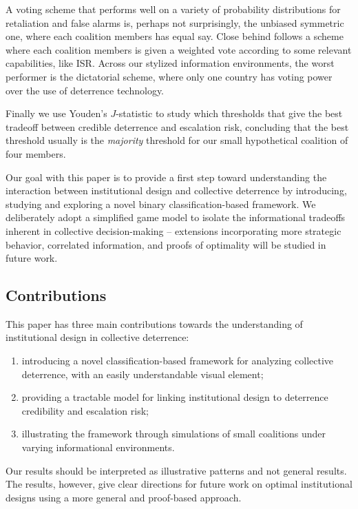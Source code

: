 A voting scheme that performs well on a variety of probability distributions for retaliation and false alarms is, perhaps not surprisingly, the unbiased symmetric one, where each coalition members has equal say. Close behind follows a scheme where each coalition members is given a weighted vote according to some relevant capabilities, like ISR. Across our stylized information environments, the worst performer is the dictatorial scheme, where only one country has voting power over the use of deterrence technology.

Finally we use Youden's $J$-statistic \parencite{Youden_1950} to study which thresholds that give the best tradeoff between credible deterrence and escalation risk, concluding that the best threshold usually is the \emph{majority} threshold for our small hypothetical coalition of four members. 

Our goal with this paper is to provide a first step toward understanding the interaction between institutional design and collective deterrence by introducing, studying and exploring a novel binary classification-based framework. We deliberately adopt a simplified game model to isolate the informational tradeoffs inherent in collective decision-making -- extensions incorporating more strategic behavior, correlated information, and proofs of optimality will be studied in future work. 

\subsection{Contributions}
This paper has three main contributions towards the understanding of institutional design in collective deterrence: 
\begin{enumerate}
    \item introducing a novel classification-based framework for analyzing collective deterrence, with an easily understandable visual element;
    \item providing a tractable model for linking institutional design to deterrence credibility and escalation risk;
    \item illustrating the framework through simulations of small coalitions under varying informational environments.
\end{enumerate}

Our results should be interpreted as illustrative patterns and not general results. The results, however, give clear directions for future work on optimal institutional designs using a more general and proof-based approach. 
